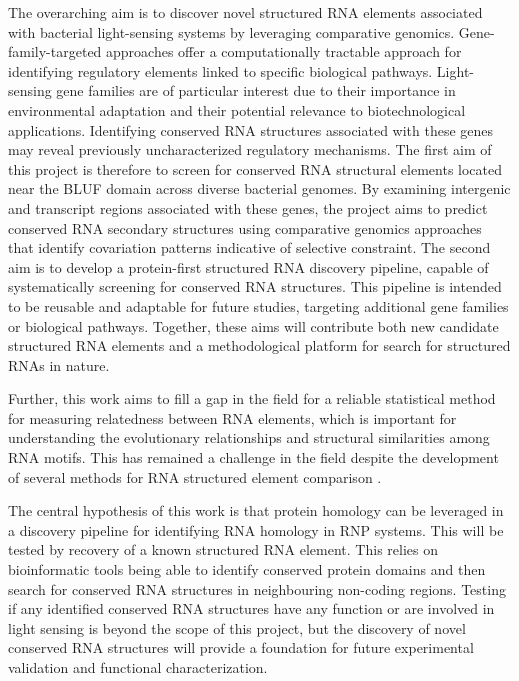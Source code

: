 The overarching aim is to discover novel structured RNA elements associated with bacterial light-sensing systems by leveraging comparative genomics. 
Gene-family-targeted approaches offer a computationally tractable approach for identifying regulatory elements linked to specific biological pathways. 
Light-sensing gene families are of particular interest due to their importance in environmental adaptation and their potential relevance to biotechnological applications. 
Identifying conserved RNA structures associated with these genes may reveal previously uncharacterized regulatory mechanisms.
The first aim of this project is therefore to screen for conserved RNA structural elements located near the \ac{BLUF} domain across diverse bacterial genomes. 
By examining intergenic and transcript regions associated with these genes, the project aims to predict conserved RNA secondary structures using comparative genomics approaches that identify covariation patterns indicative of selective constraint.
The second aim is to develop a protein-first structured RNA discovery pipeline, capable of systematically screening for conserved RNA structures. 
This pipeline is intended to be reusable and adaptable for future studies, targeting additional gene families or biological pathways. 
Together, these aims will contribute both new candidate structured RNA elements and a methodological platform for search for structured RNAs in nature.


Further, this work aims to fill a gap in the field for a reliable statistical method for measuring relatedness between RNA elements, which is important for understanding the evolutionary relationships and structural similarities among RNA motifs.
This has remained a challenge in the field despite the development of several methods for RNA structured element comparison \citep{Pratiwi2022,Eggenhofer2013}.

The central hypothesis of this work is that protein homology can be leveraged in a discovery pipeline for identifying RNA homology in \ac{RNP} systems.
This will be tested by recovery of a known structured RNA element.
This relies on bioinformatic tools being able to identify conserved protein domains and then search for conserved RNA structures in neighbouring non-coding regions.
Testing if any identified conserved RNA structures have any function or are involved in light sensing is beyond the scope of this project, but the discovery of novel conserved RNA structures will provide a foundation for future experimental validation and functional characterization.

